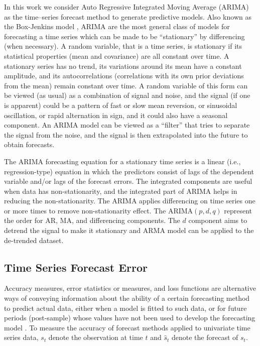 

In this work we consider Auto Regressive Integrated Moving Average (ARIMA) as the time--series forecast method to generate predictive models. Also known as the Box-Jenkins model \cite{Chatfield2019}, ARIMA are the most general class of models for forecasting a time series which can be made to be ``stationary'' by differencing (when necessary). A random variable, that is a time series, is stationary if its statistical properties (mean and covariance) are all constant over time.  A stationary series has no trend, its variations around its mean have a constant amplitude, and its autocorrelations (correlations with its own prior deviations from the mean) remain constant over time.  A random variable of this form can be viewed (as usual) as a combination of signal and noise, and the signal (if one is apparent) could be a pattern of fast or slow mean reversion, or sinusoidal oscillation, or rapid alternation in sign, and it could also have a seasonal component. An ARIMA model can be viewed as a ``filter'' that tries to separate the signal from the noise, and the signal is then extrapolated into the future to obtain forecasts.

The ARIMA forecasting equation for a stationary time series is a linear (i.e., regression-type) equation in which the predictors consist of lags of the dependent variable and/or lags of the forecast errors.  The integrated components are useful when data has non-stationarity, and the integrated part of ARIMA helps in reducing the non-stationarity. The ARIMA applies differencing on time series one or more times to remove non-stationarity effect. The ARIMA$(p, d, q)$ represent the order for AR, MA, and differencing components. The $d$ component aims to detrend the signal to make it stationary and ARMA model can be applied to the de-trended dataset. 

\subsection{Time Series Forecast Error}
\label{Sec:ErrorTSA}

Accuracy measures, error statistics or measures, and loss functions are alternative ways of conveying information about the ability of a certain forecasting method to predict actual data, either when a model is fitted to such data, or for future periods (post-sample) whose values have not been used to develop the forecasting model \cite{Makridakis1993}. To measure the accuracy of forecast methods applied to univariate time series data, $s_{t}$ denote the observation at time $t$ and $\hat{s}_t$ denote the forecast of $s_{t}$.

